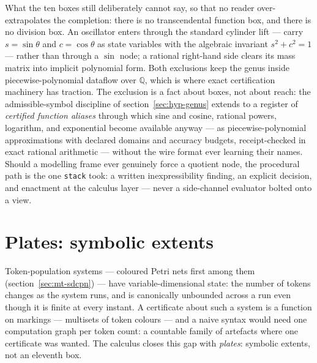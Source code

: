 What the ten boxes still deliberately cannot say, so that no reader
over-extrapolates the completion: there is no transcendental
function box, and there is no division box. An oscillator enters
through the standard cylinder lift --- carry $s = \sin\theta$ and
$c = \cos\theta$ as state variables with the algebraic invariant
$s^2 + c^2 = 1$ --- rather than through a $\sin$ node; a rational
right-hand side clears its mass matrix into implicit polynomial
form. Both exclusions keep the genus inside piecewise-polynomial
dataflow over $\mathbb{Q}$, which is where exact certification
machinery has traction. The exclusion is a fact about boxes, not
about reach: the admissible-symbol discipline of
section~\ref{sec:hyp-genus} extends to a register of \emph{certified
function aliases} through which sine and cosine, rational powers,
logarithm, and exponential become available anyway --- as
piecewise-polynomial approximations with declared domains and
accuracy budgets, receipt-checked in exact rational arithmetic ---
without the wire format ever learning their names. Should a
modelling frame ever genuinely force a quotient node, the procedural
path is the one \texttt{stack} took: a written inexpressibility
finding, an explicit decision, and enactment at the calculus layer
--- never a side-channel evaluator bolted onto a view.

\section{Plates: symbolic extents}
\label{sec:hyp-plates}

Token-population systems --- coloured Petri nets first among them
(section~\ref{sec:mt-sdcpn}) --- have variable-dimensional state: the
number of tokens changes as the system runs, and is canonically
unbounded across a run even though it is finite at every instant. A
certificate about such a system is a function on markings ---
multisets of token colours --- and a naive syntax would need one
computation graph per token count: a countable family of artefacts
where one certificate was wanted. The calculus closes this gap with
\emph{plates}: symbolic extents, not an eleventh box.

